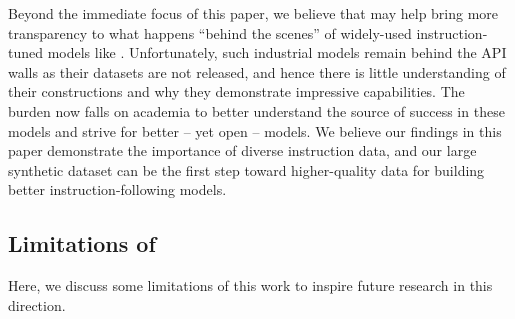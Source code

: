 Beyond the immediate focus of this paper, we believe that \name{} may help bring more transparency to what happens ``behind the scenes'' of widely-used instruction-tuned models like \gptinstruct{}. 
Unfortunately, such industrial models remain behind the API walls as their datasets are not released, and hence there is little understanding of their constructions and why they demonstrate impressive capabilities.
The burden now falls on academia to better understand the source of success in these models and strive for better -- yet open -- models. We believe our findings in this paper demonstrate the importance of diverse instruction data, and our large synthetic dataset can be the first step toward higher-quality data for building better instruction-following models.




 
\subsection{Limitations of \name}
Here, we discuss some limitations of this work to inspire future research in this direction.  

